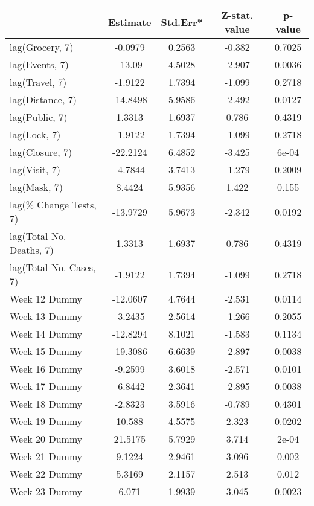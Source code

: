 \begingroup\tiny
\begin{longtable}{lcccc}
  \toprule
 & Estimate & Std.Err* & Z-stat. value & p-value \\ 
  \midrule
lag(Grocery, 7) & -0.0979 & 0.2563 & -0.382 & 0.7025 \\ 
  lag(Events, 7) & -13.09 & 4.5028 & -2.907 & 0.0036 \\ 
  lag(Travel, 7) & -1.9122 & 1.7394 & -1.099 & 0.2718 \\ 
  lag(Distance, 7) & -14.8498 & 5.9586 & -2.492 & 0.0127 \\ 
  lag(Public, 7) & 1.3313 & 1.6937 & 0.786 & 0.4319 \\ 
  lag(Lock, 7) & -1.9122 & 1.7394 & -1.099 & 0.2718 \\ 
  lag(Closure, 7) & -22.2124 & 6.4852 & -3.425 & 6e-04 \\ 
  lag(Visit, 7) & -4.7844 & 3.7413 & -1.279 & 0.2009 \\ 
  lag(Mask, 7) & 8.4424 & 5.9356 & 1.422 & 0.155 \\ 
  lag(\% Change Tests, 7) & -13.9729 & 5.9673 & -2.342 & 0.0192 \\ 
  lag(Total No. Deaths, 7) & 1.3313 & 1.6937 & 0.786 & 0.4319 \\ 
  lag(Total No. Cases, 7) & -1.9122 & 1.7394 & -1.099 & 0.2718 \\ 
  Week 12 Dummy & -12.0607 & 4.7644 & -2.531 & 0.0114 \\ 
  Week 13 Dummy & -3.2435 & 2.5614 & -1.266 & 0.2055 \\ 
  Week 14 Dummy & -12.8294 & 8.1021 & -1.583 & 0.1134 \\ 
  Week 15 Dummy & -19.3086 & 6.6639 & -2.897 & 0.0038 \\ 
  Week 16 Dummy & -9.2599 & 3.6018 & -2.571 & 0.0101 \\ 
  Week 17 Dummy & -6.8442 & 2.3641 & -2.895 & 0.0038 \\ 
  Week 18 Dummy & -2.8323 & 3.5916 & -0.789 & 0.4301 \\ 
  Week 19 Dummy & 10.588 & 4.5575 & 2.323 & 0.0202 \\ 
  Week 20 Dummy & 21.5175 & 5.7929 & 3.714 & 2e-04 \\ 
  Week 21 Dummy & 9.1224 & 2.9461 & 3.096 & 0.002 \\ 
  Week 22 Dummy & 5.3169 & 2.1157 & 2.513 & 0.012 \\ 
  Week 23 Dummy & 6.071 & 1.9939 & 3.045 & 0.0023 \\ 

\end{longtable}
